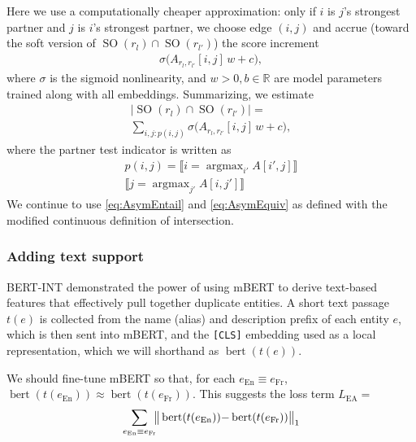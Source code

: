 \documentclass[11pt]{article}
\DeclareMathOperator{\SO}{SO}
\DeclareMathOperator{\mBERT}{bert}
\DeclareMathOperator*{\argmax}{argmax}
\def\En{\ensuremath{\text{En}}}
\def\Fr{\ensuremath{\text{Fr}}}
\begin{document}
 Here we use a computationally cheaper approximation: only if $i$ is $j$'s strongest partner and $j$ is $i$'s strongest partner, we choose edge $(i,j)$ and accrue (toward the soft version of $\SO(r_{l})\cap\SO(r_{l'})$) the score increment
\begin{align}
\sigma\big(A_{r_{l},r_{l'}}[i,j]\,w + c\big),
\end{align}
where $\sigma$ is the sigmoid nonlinearity, and $w>0, b \in \mathbb{R}$ are model parameters trained along with all embeddings.  Summarizing, we estimate
\begin{multline}
|\SO(r_{l})\cap\SO(r_{l'})| = \\
\textstyle \sum_{i,j: p(i,j)} 
\sigma\big(A_{r_{l},r_{l'}}[i,j]\,w + c\big), \label{eq:overlap}    
\end{multline}
where the partner test indicator is written as
\begin{multline}
p(i,j) = 
\llbracket \textstyle 
i=\argmax_{i'} A[i',j] \rrbracket
\\[-.5ex] 
\llbracket \textstyle 
j = \argmax_{j'} A[i,j'] \rrbracket
\end{multline}
We continue to use \eqref{eq:AsymEntail} and \eqref{eq:AsymEquiv} as defined with the modified continuous definition of intersection.


\iffalse

\subsubsection{Adding text support}

BERT-INT \citep{Tang+2020BertInt} demonstrated the power of using mBERT \citep{devlin-etal-2019-bert} to derive text-based features that effectively pull together duplicate entities.  A short text passage $t(e)$ is collected from the name (alias) and description prefix of each entity $e$, which is then sent into mBERT, and the \texttt{[CLS]} embedding used as a local representation, which we will shorthand as $\mBERT(t(e))$.

We should fine-tune mBERT so that, for each $e_\En \equiv e_\Fr$, $\mBERT(t(e_\En)) \approx \mBERT(t(e_\Fr))$.  This suggests the loss term $L_\text{EA}=$  
\begin{multline}
\sum_{e_\En \equiv e_\Fr} \hspace{-.4em}
\big\| \mBERT(t(e_\En)) {-} \mBERT(t(e_\Fr)) \big\|_1
\end{multline}
\end{document}
